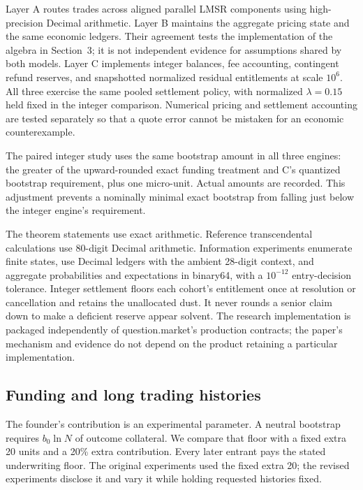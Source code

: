 \documentclass[10pt]{article}
\begin{document}
Layer A routes trades across aligned parallel LMSR components using high-precision Decimal arithmetic. Layer B maintains the aggregate pricing state and the same economic ledgers. Their agreement tests the implementation of the algebra in Section~3; it is not independent evidence for assumptions shared by both models. Layer C implements integer balances, fee accounting, contingent refund reserves, and snapshotted normalized residual entitlements at scale $10^6$. All three exercise the same pooled settlement policy, with normalized $\lambda=0.15$ held fixed in the integer comparison. Numerical pricing and settlement accounting are tested separately so that a quote error cannot be mistaken for an economic counterexample.

The paired integer study uses the same bootstrap amount in all three engines: the greater of the upward-rounded exact funding treatment and C's quantized bootstrap requirement, plus one micro-unit. Actual amounts are recorded. This adjustment prevents a nominally minimal exact bootstrap from falling just below the integer engine's requirement.

The theorem statements use exact arithmetic. Reference transcendental calculations use 80-digit Decimal arithmetic. Information experiments enumerate finite states, use Decimal ledgers with the ambient 28-digit context, and aggregate probabilities and expectations in binary64, with a $10^{-12}$ entry-decision tolerance. Integer settlement floors each cohort's entitlement once at resolution or cancellation and retains the unallocated dust. It never rounds a senior claim down to make a deficient reserve appear solvent. The research implementation is packaged independently of question.market's production contracts; the paper's mechanism and evidence do not depend on the product retaining a particular implementation.

\subsection{Funding and long trading histories}

The founder's contribution is an experimental parameter. A neutral bootstrap requires $b_0\ln N$ of outcome collateral. We compare that floor with a fixed extra 20 units and a 20\% extra contribution. Every later entrant pays the stated underwriting floor. The original experiments used the fixed extra 20; the revised experiments disclose it and vary it while holding requested histories fixed.
\end{document}
